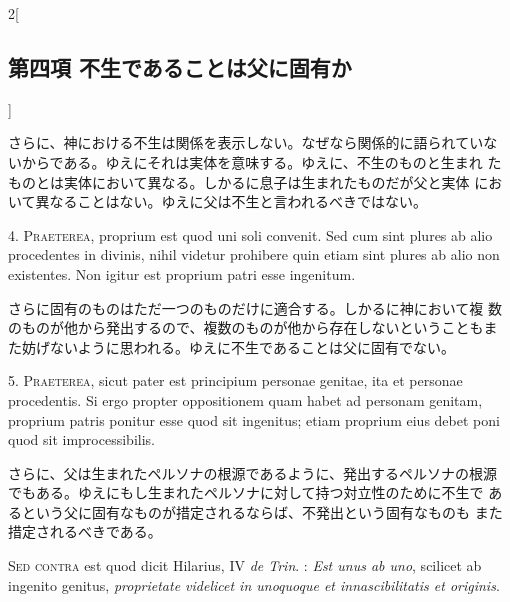 \documentclass[paper=a4paper,fontsize=10pt,jafontsize=9pt,titlepage]{jlreq}
\begin{document}
\begin{paracol}{2}[\subsection{第四項 不生であることは父に固有か}]
\switchcolumn


さらに、神における不生は関係を表示しない。なぜなら関係的に語られていな
 いからである。ゆえにそれは実体を意味する。ゆえに、不生のものと生まれ
 たものとは実体において異なる。しかるに息子は生まれたものだが父と実体
 において異なることはない。ゆえに父は不生と言われるべきではない。




4. {\scshape Praeterea}, proprium est quod uni soli convenit. Sed cum sint plures ab
alio procedentes in divinis, nihil videtur prohibere quin etiam sint
plures ab alio non existentes. Non igitur est proprium patri esse
ingenitum.


\switchcolumn


さらに固有のものはただ一つのものだけに適合する。しかるに神において複
 数のものが他から発出するので、複数のものが他から存在しないということもま
 た妨げないように思われる。ゆえに不生であることは父に固有でない。




5. {\scshape Praeterea}, sicut pater est principium personae genitae, ita et
personae procedentis. Si ergo propter oppositionem quam habet ad
personam genitam, proprium patris ponitur esse quod sit ingenitus;
etiam proprium eius debet poni quod sit improcessibilis.


\switchcolumn


さらに、父は生まれたペルソナの根源であるように、発出するペルソナの根源
 でもある。ゆえにもし生まれたペルソナに対して持つ対立性のために不生で
 あるという父に固有なものが措定されるならば、不発出という固有なものも
 また措定されるべきである。


\switchcolumn*[\subsection{s.c.}]


{\scshape Sed contra} est quod dicit Hilarius, IV {\itshape de
 Trin}. : {\itshape Est unus ab uno},
scilicet ab ingenito genitus, {\itshape proprietate videlicet in unoquoque et
innascibilitatis et originis}.


\switchcolumn



\end{paracol}
\end{document}
